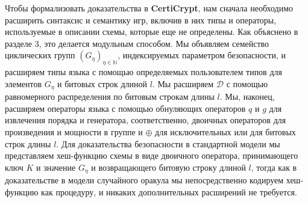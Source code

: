 \documentclass[a4paper,12pt]{report}
\begin{document}
Чтобы формализовать доказательства в \textbf{CertiCrypt}, нам сначала необходимо расширить синтаксис и семантику игр, включив в них типы и операторы, используемые в описании схемы, которые еще не определены. Как объяснено в разделе 3, это делается модульным способом. Мы объявляем семейство циклических групп $(G_\eta)_{\eta \in \mathbb{N}}$, индексируемых параметром безопасности, и расширяем типы языка с помощью определяемых пользователем типов для элементов $G_\eta$ и битовых строк длиной $l$. Мы расширяем $\mathcal{D}$ с помощью равномерного распределения по битовым строкам длины $l$. Мы, наконец, расширяем операторы языка с помощью обнуляющих операторов $q$ и $g$ для извлечения порядка и генератора, соответственно, двоичных операторов для произведения и мощности в группе и $\oplus$ для исключительных или для битовых строк длины $l$. Для доказательства безопасности в стандартной модели мы представляем хеш-функцию схемы в виде двоичного оператора, принимающего ключ $K$  и значение $G_\eta$ и возвращающего битовую строку длиной $l$, тогда как в доказательстве в модели случайного оракула мы непосредственно кодируем хеш-функцию как процедуру, и никаких дополнительных расширений не требуется.
\end{document}
